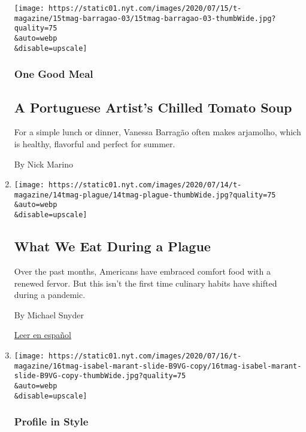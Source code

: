 \begin{enumerate}
  \texttt{[image: https://static01.nyt.com/images/2020/07/15/t-magazine/15tmag-barragao-03/15tmag-barragao-03-thumbWide.jpg?quality=75\\\&auto=webp\\\&disable=upscale]}

  \hypertarget{one-good-meal-1}{%
  \subsubsection{One Good Meal}\label{one-good-meal-1}}

  \hypertarget{a-portuguese-artists-chilled-tomato-soup}{%
  \subsection{A Portuguese Artist's Chilled Tomato
  Soup}\label{a-portuguese-artists-chilled-tomato-soup}}

  For a simple lunch or dinner, Vanessa Barragão often makes arjamolho,
  which is healthy, flavorful and perfect for summer.

  By Nick Marino
\item
  \href{/2020/07/16/t-magazine/eating-food-during-plague.html}{}

  \texttt{[image: https://static01.nyt.com/images/2020/07/14/t-magazine/14tmag-plague/14tmag-plague-thumbWide.jpg?quality=75\\\&auto=webp\\\&disable=upscale]}

  \hypertarget{what-we-eat-during-a-plague}{%
  \subsection{What We Eat During a
  Plague}\label{what-we-eat-during-a-plague}}

  Over the past months, Americans have embraced comfort food with a
  renewed fervor. But this isn't the first time culinary habits have
  shifted during a pandemic.

  By Michael Snyder

  \href{https://www.nytimes.com/es/2020/07/23/t-magazine/comida-pandemia.html}{Leer
  en español}
\item
  \href{/2020/07/16/t-magazine/isabel-marant.html}{}

  \texttt{[image: https://static01.nyt.com/images/2020/07/16/t-magazine/16tmag-isabel-marant-slide-B9VG-copy/16tmag-isabel-marant-slide-B9VG-copy-thumbWide.jpg?quality=75\\\&auto=webp\\\&disable=upscale]}

  \hypertarget{profile-in-style}{%
  \subsubsection{Profile in Style}\label{profile-in-style}}


\end{enumerate}
